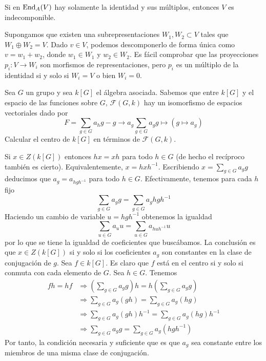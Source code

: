 \documentclass[twoside]{article}
\begin{document}
\begin{ejercicio}{3}
Si en $\operatorname{End}_A(V)$ hay solamente la identidad y sus múltiplos, entonces $V$ es indecomponible.
\end{ejercicio}
\begin{solucion}
Supongamos que existen una subrepresentaciones $W_1,W_2\subset V$ tales que $W_1\oplus W_2= V$. Dado $v\in V$, podemos descomponerlo de forma única como $v=w_1+w_2$, donde $w_1\in W_1$ y $w_2\in W_2$. Es fácil comprobar que las proyecciones $p_i:V\to W_i$ son morfismos de representaciones, pero $p_i$ es un múltiplo de la identidad si y solo si $W_i=V$ o bien $W_i=0$. 
\end{solucion}
\newpage
\begin{ejercicio}{4}
Sea $G$ un grupo y sea $k[G]$ el álgebra asociada. Sabemos que entre $k[G]$ y el espacio de las funciones sobre $G$, $\mathcal{F}(G,k)$ hay un isomorfismo de espacios vectoriales dado por
$$
F = \sum_{g\in G} a_h g - g\to a_g
 \sum_{g\in G} a_g g \mapsto (g\mapsto a_g)
$$
Calcular el centro de $k[G]$ en términos de $\mathcal{F}(G,k)$. 
\end{ejercicio}
\begin{solucion}
Si $x\in Z(k[G])$ entonces $hx=xh$ para todo $h\in G$ (de hecho el recíproco también es cierto). Equivalentemente, $x=hxh^{-1}$. Escribiendo $x=\sum_{g\in G}a_gg$ deducimos que $a_g=a_{hgh^{-1}}$ para todo $h\in G$. Efectivamente, tenemos para cada $h$ fijo
\[
\sum_{g\in G}a_gg=\sum_{g\in G}a_g hgh^{-1}
\]
Haciendo un cambio de variable $u=hgh^{-1}$ obtenemos la igualdad
\[
\sum_{u\in G}a_uu=\sum_{u\in G}a_{huh^{-1}} u
\]
por lo que se tiene la igualdad de coeficientes que buscábamos. La conclusión es que $x\in Z(k[G])$ si y solo si los coeficientes $a_g$ son constantes en la clase de conjugación de $g$. 
Sea $f\in k[G]$. Es claro que $f$ está en el centro si y solo si conmuta con cada elemento de $G$. Sea $h\in G$. Tenemos
\begin{align*}
fh =  hf &\Longrightarrow \left(\sum_{g\in G} a_g g \right)h = h\left(\sum_{g\in G} a_g g \right)\\
&\Longrightarrow \sum_{g \in G} a_g (gh) = \sum_{g \in G} a_g (hg) \\
&\Longrightarrow \sum_{g \in G} a_g (gh)h^{-1} = \sum_{g \in G} a_g (hg) h^{-1}\\
&\Longrightarrow \sum_{g \in G} a_g g = \sum_{g \in G} a_g (hgh^{-1}) 
\end{align*}
Por tanto, la condición necesaria y suficiente que es que $a_g$ sea constante entre los miembros de una misma clase de conjugación.
\end{solucion}
\newpage
\end{document}
